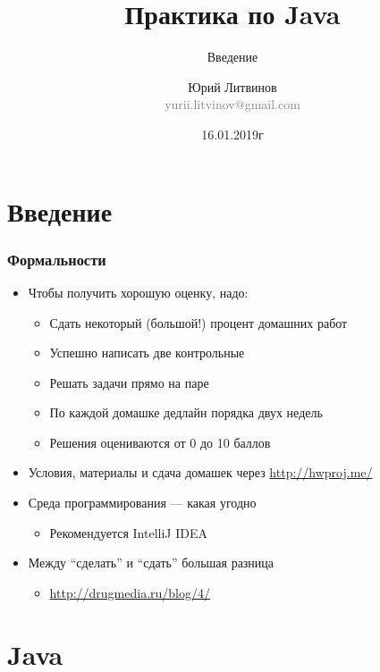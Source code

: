 \documentclass[xetex,mathserif,serif]{beamer}
\title{Практика по Java}
\subtitle{Введение}
\author[Юрий Литвинов]{Юрий Литвинов\\\small{\textcolor{gray}{yurii.litvinov@gmail.com}}}
\date{16.01.2019г}
\begin{document}
	\frame{\titlepage}

	\section{Введение}

	\begin{frame}
		\frametitle{Формальности}
		\begin{itemize}
			\item Чтобы получить хорошую оценку, надо:
			\begin{itemize}
				\item Сдать некоторый (большой!) процент домашних работ
				\item Успешно написать две контрольные
				\item Решать задачи прямо на паре
				\item По каждой домашке дедлайн порядка двух недель
				\item Решения оцениваются от 0 до 10 баллов
			\end{itemize}
			\item Условия, материалы и сдача домашек через \url{http://hwproj.me/}
			\item Среда программирования --- какая угодно
			\begin{itemize}
				\item Рекомендуется IntelliJ IDEA
			\end{itemize}
			\item Между ``сделать'' и ``сдать'' большая разница
			\begin{itemize}
			    \item \url{http://drugmedia.ru/blog/4/}
			\end{itemize}
		\end{itemize}
	\end{frame}

	\section{Java}
\end{document}
